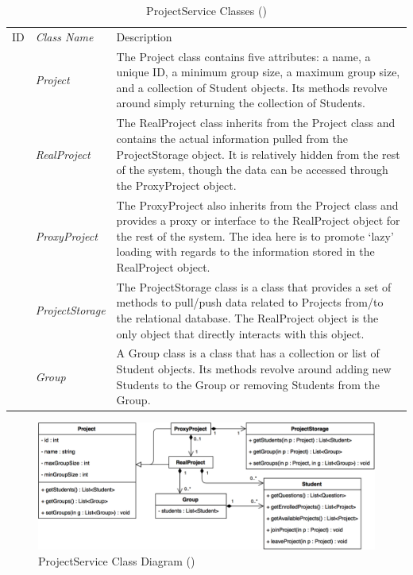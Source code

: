 \documentclass[12pt,letterpaper]{article}
\begin{document}
\begin{table}[H]
	\caption{ProjectService Classes ()} 
	\begin{tabu} to 
	    \tableheader{}ID & Class Name & Description \\
		 & Project & The Project class contains five attributes: a name, a unique ID, a minimum group size, a maximum group size, and a collection of Student objects. Its methods revolve around simply returning the collection of Students.\\
		 & RealProject & The RealProject class inherits from the Project class and contains the actual information pulled from the ProjectStorage object. It is relatively hidden from the rest of the system, though the data can be accessed through the ProxyProject object.\\
		 & ProxyProject & The ProxyProject also inherits from the Project class and provides a proxy or interface to the RealProject object for the rest of the system. The idea here is to promote `lazy' loading with regards to the information stored in the RealProject object.\\
		 & ProjectStorage & The ProjectStorage class is a class that provides a set of methods to pull/push data related to Projects from/to the relational database. The RealProject object is the only object that directly interacts with this object.\\
		 & Group & A Group class is a class that has a collection or list of Student objects. Its methods revolve around adding new Students to the Group or removing Students from the Group.\\
	\end{tabu}
\end{table}

\begin{figure}[H]
	\centering{}
	\includegraphics[scale=0.33]{imgs/d3/interfaces/project.png}
	\caption{ProjectService Class Diagram ()}
\end{figure}
\end{document}

